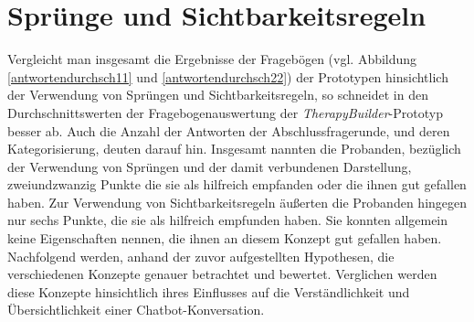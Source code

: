 \section{Sprünge und Sichtbarkeitsregeln}
Vergleicht man insgesamt die Ergebnisse der Fragebögen (vgl. Abbildung \ref{antwortendurchsch11} und \ref{antwortendurchsch22}) der Prototypen hinsichtlich der Verwendung von Sprüngen und Sichtbarkeitsregeln, so schneidet in den Durchschnittswerten der Fragebogenauswertung der \emph{TherapyBuilder}-Prototyp besser ab. Auch die Anzahl der Antworten  der Abschlussfragerunde, und deren Kategorisierung, deuten darauf hin. Insgesamt nannten die Probanden, bezüglich der Verwendung von Sprüngen und der damit verbundenen Darstellung, zweiundzwanzig Punkte die sie als hilfreich empfanden oder die ihnen gut gefallen haben. Zur Verwendung von Sichtbarkeitsregeln äußerten die Probanden hingegen nur sechs Punkte, die sie als hilfreich empfunden haben. Sie konnten allgemein keine Eigenschaften nennen, die ihnen an diesem Konzept gut gefallen haben. Nachfolgend werden, anhand der zuvor aufgestellten Hypothesen, die verschiedenen Konzepte genauer betrachtet und bewertet. Verglichen werden diese Konzepte hinsichtlich ihres Einflusses auf die Verständlichkeit und Übersichtlichkeit einer Chatbot-Konversation.


